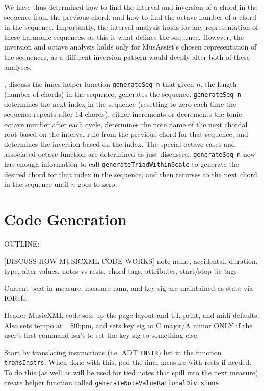 \documentclass{report}
\begin{document}
We have thus determined how to find the interval and inversion of a chord in the sequence from the previous chord, and how to find the octave number of a chord in the sequence. Importantly, the interval analysis holds for any representation of these harmonic sequences, as this is what defines the sequence. However, the inversion and octave analysis holds only for MusAssist's chosen representation of the sequences, as a different inversion pattern would deeply alter both of these analyses.

, discuss the inner helper function \verb.generateSeq n. that  given $n$, the length (number of chords) in the sequence, generates the sequence.  \verb.generateSeq n. determines the next index  in the sequence (resetting to zero each  time the sequence repeats after 14 chords), either  increments or decrements the tonic octave number after each cycle, determines the note name of the next chordal root based on the interval rule from the previous chord for that sequence, and determines the inversion based on the index. The special octave cases and associated octave function are determined as just discussed. \verb.generateSeq n. now has enough information to call  \verb.generateTriadWithinScale. to generate the desired chord for that index in the sequence, and then recurses to the next chord in the sequence until $n$ goes to zero. 
\chapter{Code Generation}
\label{chap:codegen}

OUTLINE:

[DISCUSS HOW MUSICXML CODE WORKS]
note name, accidental, duration, type, alter values, notes vs rests, chord tags, attributes, start/stop tie tags

Current beat in measure, measure num, and key sig are maintained as state via IORefs.

Header MusicXML code sets up the page layout and UI, print, and midi defaults. Also sets tempo at \musQuarter=80bpm, and sets key sig to C major/A minor ONLY if the user's first command isn't to set the key sig to something else.

Start by translating instructions (i.e. ADT \verb.INSTR.) list in the function \verb.transInstrs.. When done with this, pad the final measure with rests if needed. To do this (as well as will be used for tied notes that spill into the next measure), create helper function called \verb.generateNoteValueRationalDivisions. 
\end{document}
